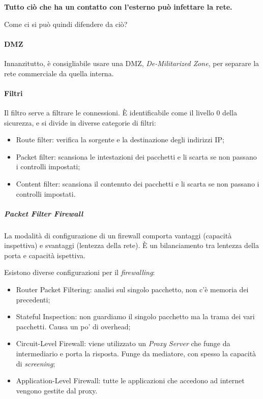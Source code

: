 \textbf{Tutto ciò che ha un contatto con l'esterno può infettare la rete.}

Come ci si può quindi difendere da ciò?
\paragraph*{DMZ} Innanzitutto, è consigliabile usare una DMZ,
\textit{De-Militarized Zone}, per separare la rete commerciale da quella
interna.



\paragraph*{Filtri}

Il filtro serve a filtrare le connessioni. È identificabile come il livello 0
della sicurezza, e si divide in diverse categorie di filtri:
\begin{itemize}
\item Route filter: verifica la sorgente e la destinazione degli indirizzi IP;
\item Packet filter: scansiona le intestazioni dei pacchetti e li scarta se non
passano i controlli impostati;
\item Content filter: scansiona il contenuto dei pacchetti e li scarta se non
passano i controlli impostati.
\end{itemize}

\subparagraph*{Packet Filter Firewall}

La modalità di configurazione di un firewall comporta vantaggi (capacità
inspettiva) e svantaggi (lentezza della rete). È un bilanciamento tra lentezza
della porta e capacità ispettiva.

Esistono diverse configurazioni per il \textit{firewalling}:
\begin{itemize}
 \item Router Packet Filtering: analisi sul singolo pacchetto, non c'è memoria
dei precedenti;
 \item Stateful Inspection: non guardiamo il singolo pacchetto ma la trama dei
vari pacchetti. Causa un po' di overhead;
 \item Circuit-Level Firewall: viene utilizzato un \textit{Proxy Server} che
funge da intermediario e porta la risposta. Funge da mediatore, con spesso la
capacità di \textit{screening};
 \item Application-Level Firewall: tutte le applicazioni che accedono ad
internet vengono gestite dal proxy.
\end{itemize}


